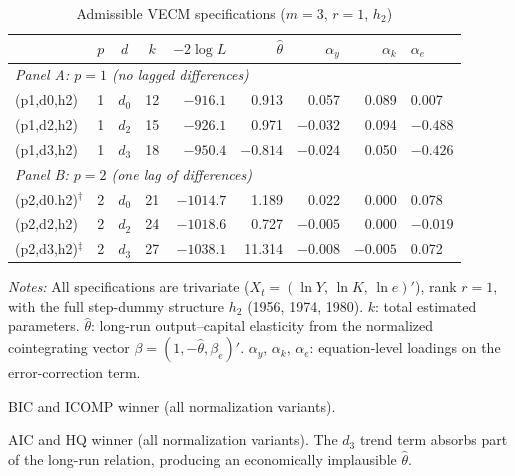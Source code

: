 
\begin{table}[htbp]
	\centering
	\small
	\caption{Admissible VECM specifications ($m=3$, $r=1$, $h_2$)}
	\label{tab:S2_admissible}
	\begin{threeparttable}
		\begin{tabular}{lcccrrrrl}
			\toprule
			& $p$ & $d$ & $k$ & $-2\log L$ & $\hat{\theta}$ & $\alpha_y$ & $\alpha_k$ & $\alpha_e$ \\
			\midrule
			\multicolumn{9}{l}{\textit{Panel A: $p = 1$ (no lagged differences)}} \\[4pt]
			(p1,d0,h2) & 1 & $d_0$ & 12 & $-916.1$  &  0.913 &  0.057 &  0.089 &  0.007 \\
			(p1,d2,h2) & 1 & $d_2$ & 15 & $-926.1$  &  0.971 & $-0.032$ &  0.094 & $-0.488$ \\
			(p1,d3,h2) & 1 & $d_3$ & 18 & $-950.4$  & $-0.814$ & $-0.024$ &  0.050 & $-0.426$ \\[6pt]
			\multicolumn{9}{l}{\textit{Panel B: $p = 2$ (one lag of differences)}} \\[4pt]
			(p2,d0.h2)$^{\dagger}$ & 2 & $d_0$ & 21 & $-1014.7$ &  1.189 &  0.022 &  0.000 &  0.078 \\
			(p2,d2,h2) & 2 & $d_2$ & 24 & $-1018.6$ &  0.727 & $-0.005$ &  0.000 & $-0.019$ \\
			(p2,d3,h2)$^{\ddagger}$ & 2 & $d_3$ & 27 & $-1038.1$ & 11.314 & $-0.008$ & $-0.005$ &  0.072 \\
			\bottomrule
		\end{tabular}
		\begin{tablenotes}
			\scriptsize
			\item \textit{Notes:} All specifications are trivariate
			($X_t = (\ln Y,\, \ln K,\, \ln e)'$), rank $r=1$, with the full
			step-dummy structure $h_2$ (1956, 1974, 1980). $k$: total estimated
			parameters. $\hat{\theta}$: long-run output--capital elasticity from
			the normalized cointegrating vector $\beta = (1, -\hat{\theta},
			\beta_e)'$. $\alpha_y$, $\alpha_k$, $\alpha_e$: equation-level
			loadings on the error-correction term.
			\item[$\dagger$] BIC and ICOMP winner (all normalization variants).
			\item[$\ddagger$] AIC and HQ winner (all normalization variants).
			The $d_3$ trend term absorbs part of the long-run relation,
			producing an economically implausible $\hat{\theta}$.
		\end{tablenotes}
	\end{threeparttable}
\end{table}